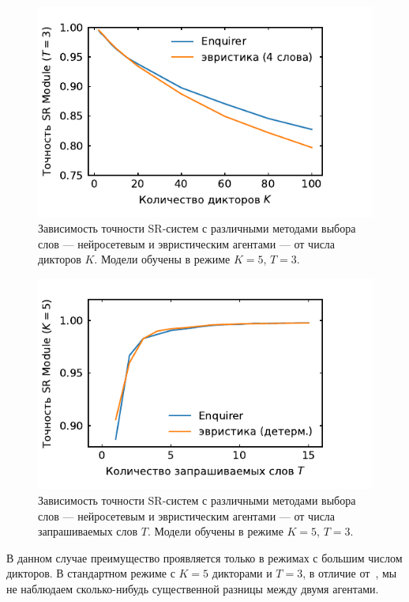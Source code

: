 \begin{figure}[!h]
    \centering
    \includegraphics[scale=1.0]{../plots/guest_sweep_heuristic.pdf}
    \caption{Зависимость точности SR-систем с различными методами выбора слов
    --- нейросетевым и эвристическим агентами --- от
    числа дикторов $K$. Модели обучены в режиме $K = 5$, $T = 3$.}
\end{figure}

\begin{figure}[!h]
    \centering
    \includegraphics[scale=1.0]{../plots/word_sweep_heuristic.pdf}
    \caption{Зависимость точности SR-систем с различными методами выбора слов
    --- нейросетевым и эвристическим агентами --- от
    числа запрашиваемых слов $T$. Модели обучены в режиме $K = 5$, $T = 3$.}
\end{figure}

В данном случае преимущество \enquirer{} проявляется только в режимах с большим
числом дикторов. В стандартном режиме с $K = 5$ дикторами и $T = 3$, в отличие
от~\citeisr{}, мы не наблюдаем сколько-нибудь существенной разницы между двумя
агентами.


